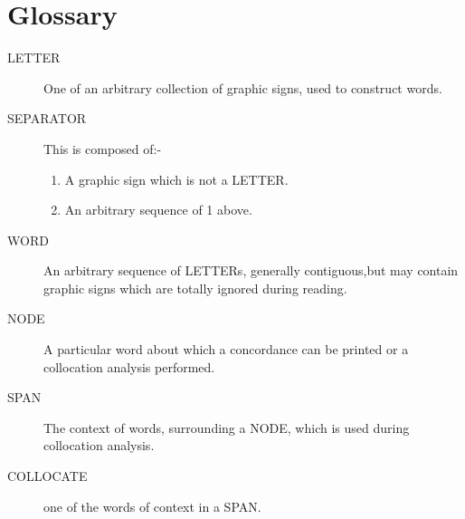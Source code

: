 \section{Glossary}
\begin{description}
\item[LETTER]  One of an arbitrary collection of graphic signs, used to
               construct words.
\item[SEPARATOR] This is composed of:-
\begin{enumerate}
\item A graphic sign which is not a LETTER.
\item An arbitrary sequence of 1 above.
\end{enumerate}
\item[WORD]  An arbitrary sequence of LETTERs, generally contiguous,but may
             contain graphic signs which are totally ignored during reading.
\item[NODE]  A particular word about which a concordance can be printed or a
        collocation analysis performed.
\item[SPAN]  The context of words, surrounding a NODE, which is used during
        collocation analysis.
\item[COLLOCATE]  one of the words of context in a SPAN.
\end{description}

